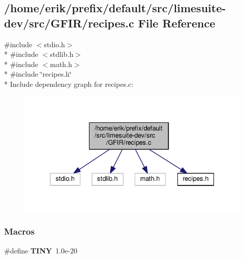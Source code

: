 \subsection{/home/erik/prefix/default/src/limesuite-\/dev/src/\+G\+F\+I\+R/recipes.c File Reference}
\label{recipes_8c}
{\ttfamily \#include $<$stdio.\+h$>$}\\*
{\ttfamily \#include $<$stdlib.\+h$>$}\\*
{\ttfamily \#include $<$math.\+h$>$}\\*
{\ttfamily \#include \char`\"{}recipes.\+h\char`\"{}}\\*
Include dependency graph for recipes.\+c\+:
\nopagebreak
\begin{figure}[H]
\begin{center}
\leavevmode
\includegraphics[width=332pt]{df/d6a/recipes_8c__incl}
\end{center}
\end{figure}
\subsubsection*{Macros}
\begin{DoxyCompactItemize}
\item 
\#define {\bf T\+I\+NY}~1.\+0e-\/20
\end{DoxyCompactItemize}
